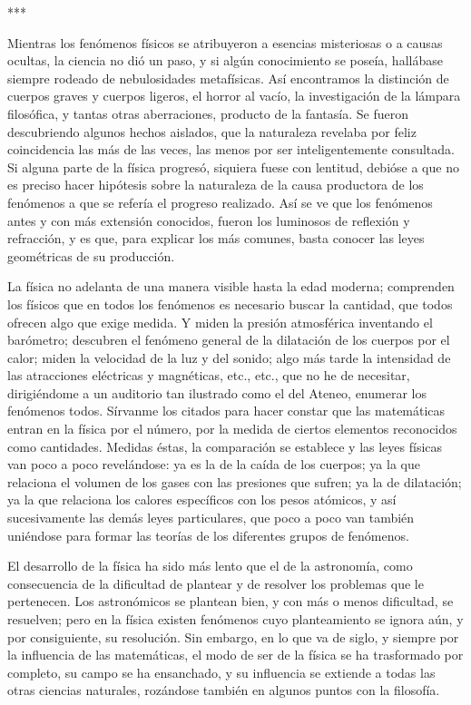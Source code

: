 \documentclass[a4paper, 12pt]{article}
\begin{document}
\bigskip

\centerline{***}







Mientras los fenómenos físicos se atribuyeron a esencias misteriosas o a causas ocultas, la ciencia no dió un paso, y si algún conocimiento se poseía, hallábase siempre rodeado de nebulosidades metafísicas. Así encontramos la distinción de cuerpos graves y cuerpos ligeros, el horror al vacío, la investigación de la lámpara filosófica, y tantas otras aberraciones, producto de la fantasía. Se fueron descubriendo algunos hechos aislados, que la naturaleza revelaba por feliz coincidencia las más de las veces, las menos por ser inteligentemente consultada. Si alguna parte de la física progresó, siquiera fuese con lentitud, debióse a que no es preciso hacer hipótesis sobre la naturaleza de la causa productora de los fenómenos a que se refería el progreso realizado. Así se ve que los fenómenos antes y con más extensión conocidos, fueron los luminosos de reflexión y refracción, y es que, para explicar los más comunes, basta conocer las leyes geométricas de su producción.

La física no adelanta de una manera visible hasta la edad moderna; comprenden los físicos que en todos los fenómenos es necesario buscar la cantidad, que todos ofrecen algo que exige medida. Y miden la presión atmosférica inventando el barómetro; descubren el fenómeno general de la dilatación de los cuerpos por el calor; miden la velocidad de la luz y del sonido; algo más tarde la intensidad de las atracciones eléctricas y magnéticas, etc., etc., que no he de necesitar, dirigiéndome a un auditorio tan ilustrado como el del Ateneo, enumerar los fenómenos todos. Sírvanme los citados para hacer constar que las matemáticas entran en la física por el número, por la medida de ciertos elementos reconocidos como cantidades. Medidas éstas, la comparación se establece y las leyes físicas van poco a poco revelándose: ya es la de la caída de los cuerpos; ya la que relaciona el volumen de los gases con las presiones que sufren; ya la de dilatación; ya la que relaciona los calores específicos con los pesos atómicos, y así sucesivamente las demás leyes particulares, que poco a poco van también uniéndose para formar las teorías de los diferentes grupos de fenómenos.

El desarrollo de la física ha sido más lento que el de la astronomía, como consecuencia de la dificultad de plantear y de resolver los problemas que le pertenecen. Los astronómicos se plantean bien, y con más o menos dificultad, se resuelven; pero en la física existen fenómenos cuyo planteamiento se ignora aún, y por consiguiente, su resolución.
Sin embargo, en lo que va de siglo, y siempre por la influencia de las matemáticas, el modo de ser de la física se ha trasformado por completo, su campo se ha ensanchado, y su influencia se extiende a todas las otras ciencias naturales, rozándose también en algunos puntos con la filosofía.
\end{document}
